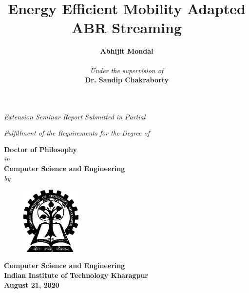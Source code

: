 \title{\bf{Energy Efficient Mobility Adapted ABR Streaming}}
\date{}
\author{}
\maketitle
\thispagestyle{empty}
\begin{center}
	\vspace*{4mm}
	\textit{Extension Seminar Report Submitted in Partial}
	\par
	\vspace*{3mm}
	\textit{Fulfillment of the Requirements for the Degree of}
	\par
	\vspace*{5mm}
	{\large\textbf{Doctor of Philosophy}\\
		\vspace*{2mm}\textit{in}\\
		\vspace*{2mm}\large\textbf{Computer Science and Engineering}
		\\\vspace*{2mm}\textit{by}\\
		\vspace*{2mm}}
	\author{\large\textbf{Abhijit Mondal}\\
		\vspace*{2mm}{\small{[Roll No - 15CS91R09]}}\\
		\vspace*{15mm}\textit{Under the supervision of}\\
		\vspace*{2mm}\textbf{Dr. Sandip Chakraborty}\\}
	\vspace*{25mm}
	\begin{figure}[!ht]
		\centering
		\includegraphics[width=3cm]{iit_logo}
	\end{figure}
	\bf{Computer Science and Engineering
		\\Indian Institute of Technology Kharagpur
	}\\
	August 21, 2020
\end{center}
\newpage